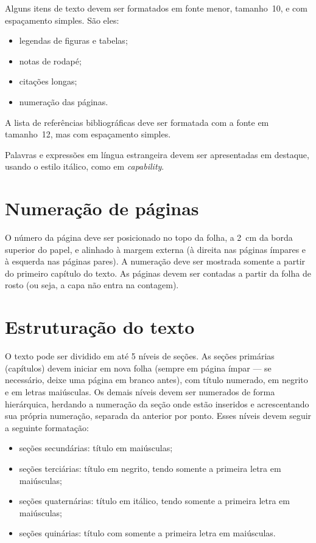 \documentclass{ifsultcc}
\begin{document}
Alguns itens de texto devem ser formatados em fonte menor, tamanho~10, e com espaçamento simples.  São eles:
\begin{itemize}
	\item legendas de figuras e tabelas;
	\item notas de rodapé;
	\item citações longas;
	\item numeração das páginas.
\end{itemize}

A lista de referências bibliográficas deve ser formatada com a fonte em tamanho~12, mas com espaçamento simples.

Palavras e expressões em língua estrangeira devem ser apresentadas em destaque, usando o estilo itálico, como em \textit{capability}.

\section{Numeração de páginas}
O número da página deve ser posicionado no topo da folha, a 2~cm da borda superior do papel, e alinhado à margem externa (à direita nas páginas ímpares e à esquerda nas páginas pares).  A numeração deve ser mostrada somente a partir do primeiro capítulo do texto.  As páginas devem ser contadas a partir da folha de rosto (ou seja, a capa não entra na contagem).  

\section{Estruturação do texto}
O texto pode ser dividido em até 5 níveis de seções. As seções primárias (capítulos) devem iniciar em nova folha (sempre em página ímpar --- se necessário, deixe uma página em branco antes), com título numerado, em negrito e em letras maiúsculas. Os demais níveis devem ser numerados de forma hierárquica, herdando a numeração da seção onde estão inseridos e acrescentando sua própria numeração, separada da anterior por ponto. Esses níveis devem seguir a seguinte formatação:
\begin{itemize}
	\item seções secundárias: título em maiúsculas;
	\item seções terciárias: título em negrito, tendo somente a primeira letra em maiúsculas;
	\item seções quaternárias: título em itálico, tendo somente a primeira letra em maiúsculas;
	\item seções quinárias: título com somente a primeira letra em maiúsculas.
\end{itemize}
\end{document}

